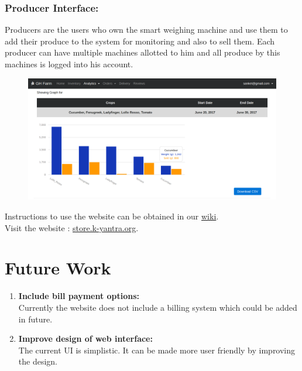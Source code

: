 \documentclass[a4paper,12pt,oneside]{book}
\begin{document}
		\subsubsection{Producer Interface:}
		Producers are the users who own the smart weighing machine and use them to add their produce to the system for monitoring and also to sell them. Each producer can have multiple machines allotted to him and all produce by this machines is logged into his account.
		\begin{figure}[!ht]
			\centering
			\includegraphics[width=1.0\linewidth]{analytics.png}
		\end{figure}
		
		Instructions to use the website can be obtained in our \href{https://github.com/eYSIP-2017/eYSIP-2017_Development_of_Web_Interface_for_GH_Farm_Produce/wiki}{wiki}.\\
		Visit the website : \href{http://store.k-yantra.org}{store.k-yantra.org}.\\
		
		
		\section{Future Work}
		\begin{enumerate}
			\item  \textbf{Include bill payment options:}\\
			Currently the website does not include a billing system which could be added in future.
			
			\item \textbf{Improve design of web interface:}\\
			The current UI is simplistic. It can be made more user friendly by improving the design.
		\end{enumerate}
		
\end{document}
